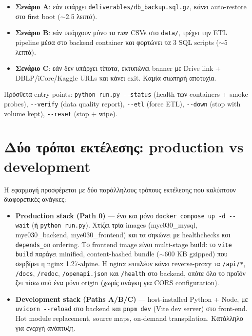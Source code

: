 \begin{itemize}\setlength{\itemsep}{0.2em}
    \item \textbf{Σενάριο A}: εάν υπάρχει
          \texttt{deliverables/db\_backup.sql.gz}, κάνει
          auto-restore στο first boot ($\sim$2.5 λεπτά).
    \item \textbf{Σενάριο B}: εάν υπάρχουν μόνο τα raw CSVs στο
          \texttt{data/}, τρέχει την ETL pipeline μέσα στο backend
          container και φορτώνει τα 3 SQL scripts ($\sim$5 λεπτά).
    \item \textbf{Σενάριο C}: εάν δεν υπάρχει τίποτα, εκτυπώνει
          banner με Drive link + DBLP/iCore/Kaggle URLs και κάνει
          exit. Καμία σιωπηρή αποτυχία.
\end{itemize}

Πρόσθετα entry points: \texttt{python run.py -{}-status} (health των
containers + smoke probes), \texttt{-{}-verify} (data quality
report), \texttt{-{}-etl} (force ETL), \texttt{-{}-down} (stop with
volume kept), \texttt{-{}-reset} (stop + wipe).

\section{Δύο τρόποι εκτέλεσης: production vs development}

Η εφαρμογή προσφέρεται με δύο παράλληλους τρόπους εκτέλεσης που
καλύπτουν διαφορετικές ανάγκες:

\begin{itemize}
    \item \textbf{Production stack (Path 0)} --- ένα και μόνο
          \texttt{docker compose up -d -{}-wait} (ή
          \texttt{python run.py}). Χτίζει τρία images
          (mye030\_mysql, mye030\_backend, mye030\_frontend) και
          τα σηκώνει με healthchecks και \texttt{depends\_on}
          ordering. Το frontend image είναι multi-stage build: το
          \texttt{vite build} παράγει minified, content-hashed bundle
          ($\sim$600 KB gzipped) που σερβίρει η nginx 1.27-alpine.
          Η nginx επιπλέον κάνει reverse-proxy τα
          \texttt{/api/*}, \texttt{/docs}, \texttt{/redoc},
          \texttt{/openapi.json} και \texttt{/health} στο backend,
          οπότε όλο το προϊόν ζει πίσω από ένα μόνο origin (χωρίς
          ανάγκη για CORS configuration).
    \item \textbf{Development stack (Paths A/B/C)} ---
          host-installed Python + Node, με \texttt{uvicorn -{}-reload}
          στο backend και \texttt{pnpm dev} (Vite dev server) στο
          front-end. Hot module replacement, source maps, on-demand
          transpilation. Κατάλληλο για ενεργή ανάπτυξη.
\end{itemize}

